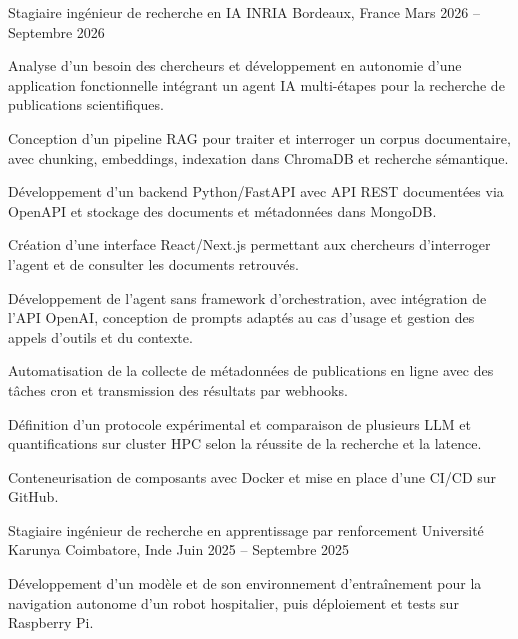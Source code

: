 
\begin{cventries}
  \cventry
    {Stagiaire ingénieur de recherche en IA}
    {INRIA}
    {Bordeaux, France}
    {Mars 2026 -- Septembre 2026}
    {
      \begin{cvitems}
        \item {Analyse d’un besoin des chercheurs et développement en autonomie d’une application fonctionnelle intégrant un agent IA multi-étapes pour la recherche de publications scientifiques.}
        \item {Conception d’un pipeline RAG pour traiter et interroger un corpus documentaire, avec chunking, embeddings, indexation dans ChromaDB et recherche sémantique.}
        \item {Développement d’un backend Python/FastAPI avec API REST documentées via OpenAPI et stockage des documents et métadonnées dans MongoDB.}
        \item {Création d’une interface React/Next.js permettant aux chercheurs d’interroger l’agent et de consulter les documents retrouvés.}
        \item {Développement de l’agent sans framework d’orchestration, avec intégration de l’API OpenAI, conception de prompts adaptés au cas d’usage et gestion des appels d’outils et du contexte.}
        \item {Automatisation de la collecte de métadonnées de publications en ligne avec des tâches cron et transmission des résultats par webhooks.}
        \item {Définition d’un protocole expérimental et comparaison de plusieurs LLM et quantifications sur cluster HPC selon la réussite de la recherche et la latence.}
        \item {Conteneurisation de composants avec Docker et mise en place d’une CI/CD sur GitHub.}
      \end{cvitems}
    }

  \cventry
    {Stagiaire ingénieur de recherche en apprentissage par renforcement}
    {Université Karunya}
    {Coimbatore, Inde}
    {Juin 2025 -- Septembre 2025}
    {
      \begin{cvitems}
        \item {Développement d’un modèle et de son environnement d’entraînement pour la navigation autonome d’un robot hospitalier, puis déploiement et tests sur Raspberry Pi.}
      \end{cvitems}
    }
\end{cventries}
